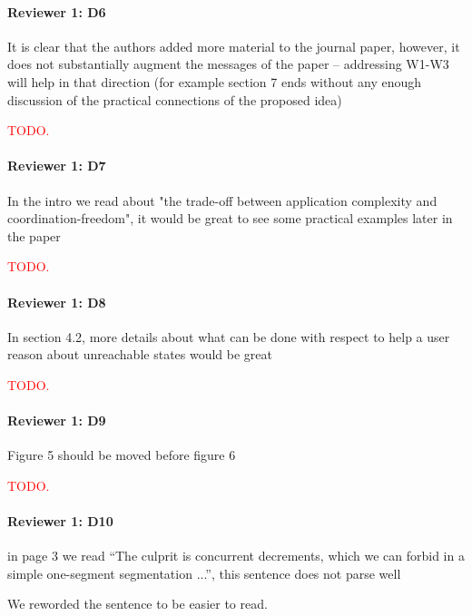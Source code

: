\documentclass[9pt]{article}
\begin{document}
\begin{multicols*}{2}
\paragraph{Reviewer 1: D6}
\begin{feedback}
  It is clear that the authors added more material to the journal paper,
  however, it does not substantially augment the messages of the paper --
  addressing W1-W3 will help in that direction (for example section 7 ends
  without any enough discussion of the practical connections of the proposed
  idea)
\end{feedback}
\textcolor{red}{TODO.}

\paragraph{Reviewer 1: D7}
\begin{feedback}
  In the intro we read about "the trade-off between application complexity and
  coordination-freedom", it would be great to see some practical examples later
  in the paper
\end{feedback}
\textcolor{red}{TODO.}

\paragraph{Reviewer 1: D8}
\begin{feedback}
  In section 4.2, more details about what can be done with respect to help a
  user reason about unreachable states would be great
\end{feedback}
\textcolor{red}{TODO.}

\paragraph{Reviewer 1: D9}
\begin{feedback}
  Figure 5 should be moved before figure 6
\end{feedback}
\textcolor{red}{TODO.}

\paragraph{Reviewer 1: D10}
\begin{feedback}
  in page 3 we read ``The culprit is concurrent decrements, which we can forbid
  in a simple one-segment segmentation ...'', this sentence does not parse well
\end{feedback}
We reworded the sentence to be easier to read.


\end{multicols*}
\end{document}
